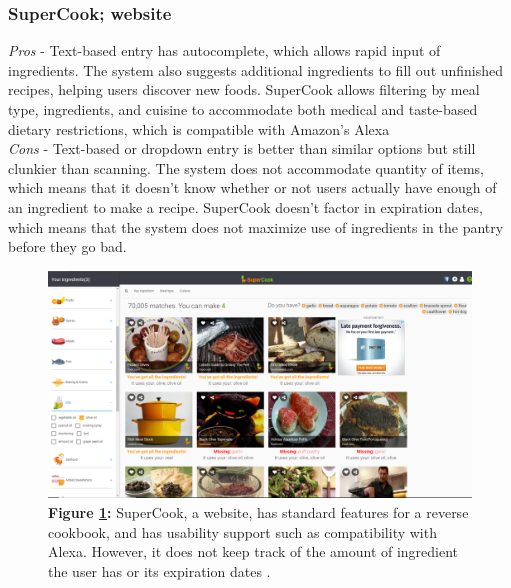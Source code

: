 \documentclass{sigchi}
\begin{document}
	\subsubsection{\textbf{SuperCook}; website}
		\textit{Pros} - Text-based entry has autocomplete, which allows rapid input of ingredients. The system also suggests additional ingredients to fill out unfinished recipes, helping users discover new foods. SuperCook allows filtering by meal type, ingredients, and cuisine to accommodate both medical and taste-based dietary restrictions, which is compatible with Amazon's Alexa\\
		\textit{Cons} - Text-based or dropdown entry is better than similar options but still clunkier than scanning. The system does not accommodate quantity of items, which means that it doesn't know whether or not users actually have enough of an ingredient to make a recipe. SuperCook doesn't factor in expiration dates, which means that the system does not maximize use of ingredients in the pantry before they go bad.
		\begin{figure}[htb!]
		\centering
			\includegraphics[width=0.8\columnwidth]{sc.png}\\
			\textbf{Figure \ref{fig:sc}:} SuperCook, a website, has standard features for a reverse cookbook, and has usability support such as compatibility with Alexa. However, it does not keep track of the amount of ingredient the user has or its expiration dates \cite{supercook}.
			\label{fig:sc}
		\end{figure}
\end{document}
